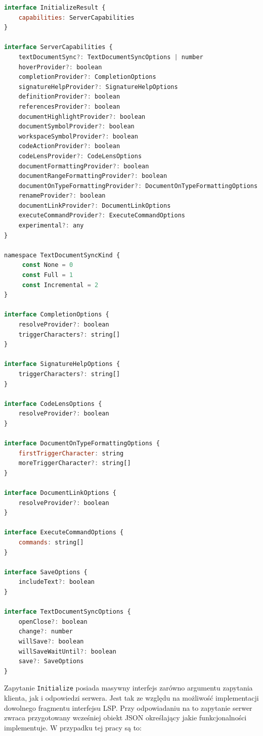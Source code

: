 \begin{lstlisting}[language=JavaScript, basicstyle=\fontsize{9}{10}\ttfamily, title=Struktura odpowiedzi]
interface InitializeResult {
    capabilities: ServerCapabilities
}

interface ServerCapabilities {
    textDocumentSync?: TextDocumentSyncOptions | number
    hoverProvider?: boolean
    completionProvider?: CompletionOptions
    signatureHelpProvider?: SignatureHelpOptions
    definitionProvider?: boolean
    referencesProvider?: boolean
    documentHighlightProvider?: boolean
    documentSymbolProvider?: boolean
    workspaceSymbolProvider?: boolean
    codeActionProvider?: boolean
    codeLensProvider?: CodeLensOptions
    documentFormattingProvider?: boolean
    documentRangeFormattingProvider?: boolean
    documentOnTypeFormattingProvider?: DocumentOnTypeFormattingOptions
    renameProvider?: boolean
    documentLinkProvider?: DocumentLinkOptions
    executeCommandProvider?: ExecuteCommandOptions
    experimental?: any
}

namespace TextDocumentSyncKind {
     const None = 0
     const Full = 1
     const Incremental = 2
}

interface CompletionOptions {
    resolveProvider?: boolean
    triggerCharacters?: string[]
}

interface SignatureHelpOptions {
    triggerCharacters?: string[]
}

interface CodeLensOptions {
    resolveProvider?: boolean
}

interface DocumentOnTypeFormattingOptions {
    firstTriggerCharacter: string
    moreTriggerCharacter?: string[]
}

interface DocumentLinkOptions {
    resolveProvider?: boolean
}

interface ExecuteCommandOptions {
    commands: string[]
}

interface SaveOptions {
    includeText?: boolean
}

interface TextDocumentSyncOptions {
    openClose?: boolean
    change?: number
    willSave?: boolean
    willSaveWaitUntil?: boolean
    save?: SaveOptions
}
\end{lstlisting}
Zapytanie \texttt{Initialize} posiada masywny interfejs zarówno argumentu zapytania klienta, jak i odpowiedzi serwera. Jest tak ze względu na możliwość implementacji dowolnego fragmentu interfejsu LSP. Przy odpowiadaniu na to zapytanie serwer zwraca przygotowany wcześniej obiekt JSON określający jakie funkcjonalności implementuje. W przypadku tej pracy są to:

